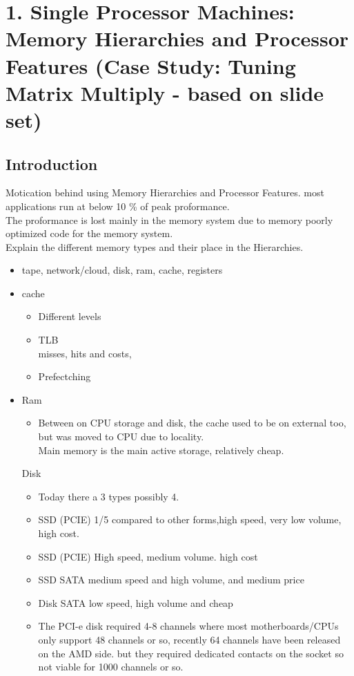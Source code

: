 \documentclass[a4paper,10pt,titlepage]{report}
\begin{document}
\section{
1. Single Processor Machines: Memory Hierarchies and Processor Features (Case Study:
Tuning Matrix Multiply - based on slide set) }
\subsection{Introduction}
Motication behind using Memory Hierarchies and Processor Features. most applications run at below 10 \% of peak proformance. \\
The proformance is lost mainly in the memory system due to memory poorly optimized code for the memory system.\\


Explain the different memory types and their place in the Hierarchies.\\
\begin{itemize}
\item tape, network/cloud, disk, ram, cache, registers
\item cache
	
\begin{itemize}
\item Different levels
\item TLB \\ misses, hits and costs,
\item Prefectching 
\end{itemize}
\item Ram
\begin{itemize}
\item Between on CPU storage and disk, the cache used to be on external too, but was moved to CPU due to locality.\\
Main memory is the main active storage, relatively cheap.
\end{itemize}
Disk
\begin{itemize}
\item	Today there a 3 types possibly 4.
\item	SSD (PCIE) 1/5 compared to other forms,high speed, very low volume, high cost.
\item	SSD (PCIE) High speed, medium volume. high cost 
\item	SSD SATA medium speed and high volume, and medium price
\item	Disk SATA low speed, high volume and cheap
\item	The PCI-e disk required 4-8 channels where most motherboards/CPUs only support 48 channels or so, recently 64 channels have been released on the AMD side. but they required dedicated contacts on the socket so not viable for 1000 channels or so.
\end{itemize}

\end{itemize}
\end{document}
